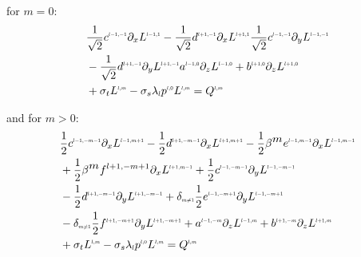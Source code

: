 for $m=0$:
\begin{align}
&
\frac{1}{\sqrt{2}}c^{\scaleto{l-1,-1}{4pt}}\partial_x L^{\scaleto{l-1,1}{4pt}}
-\frac{1}{\sqrt{2}}d^{\scaleto{l+1,-1}{4pt}}\partial_x L^{\scaleto{l+1,1}{4pt}}
\frac{1}{\sqrt{2}}c^{\scaleto{l-1,-1}{4pt}}\partial_y L^{\scaleto{l-1,-1}{4pt}}
\nonumber
\\&
-\frac{1}{\sqrt{2}}d^{\scaleto{l+1,-1}{4pt}}\partial_y L^{\scaleto{l+1,-1}{4pt}}
a^{\scaleto{l-1,0}{4pt}}\partial_z L^{\scaleto{l-1,0}{4pt}}
+b^{\scaleto{l+1,0}{4pt}}\partial_z L^{\scaleto{l+1,0}{4pt}}
\nonumber
\\&
+\sigma_t L^{\scaleto{l,m}{4pt}}
-\sigma_s\lambda_{\scaleto{l}{4pt}}p^{\scaleto{l,0}{4pt}}L^{\scaleto{l,m}{4pt}}
= Q^{\scaleto{l,m}{4pt}}
\label{eq:rpn_m_=_z}
\end{align}

and for $m>0$:
\begin{align}
&
\frac{1}{2}c^{\scaleto{l-1,-m-1}{4pt}}\partial_x L^{\scaleto{l-1,m+1}{4pt}}
-\frac{1}{2}d^{\scaleto{l+1,-m-1}{4pt}}\partial_x L^{\scaleto{l+1,m+1}{4pt}}
-\frac{1}{2}\beta^{\scaleto{m}{4pt}}e^{\scaleto{l-1,m-1}{4pt}}\partial_x L^{\scaleto{l-1,m-1}{4pt}}
\nonumber
\\&
+\frac{1}{2}\beta^{\scaleto{m}{4pt}}f^{l+1,-m+1}\partial_x L^{\scaleto{l+1,m-1}{4pt}}
+\frac{1}{2}c^{\scaleto{l-1,-m-1}{4pt}}\partial_y L^{\scaleto{l-1,-m-1}{4pt}}
\nonumber
\\&
-\frac{1}{2}d^{\scaleto{l+1,-m-1}{4pt}}\partial_y L^{\scaleto{l+1,-m-1}{4pt}}
+\delta_{\scaleto{m\neq 1}{4pt}}\frac{1}{2}e^{\scaleto{l-1,-m+1}{4pt}}\partial_y L^{\scaleto{l-1,-m+1}{4pt}}
\nonumber
\\&
-\delta_{\scaleto{m\neq 1}{4pt}}\frac{1}{2}f^{\scaleto{l+1,-m+1}{4pt}}\partial_y L^{\scaleto{l+1,-m+1}{4pt}}
+a^{\scaleto{l-1,-m}{4pt}}\partial_z L^{\scaleto{l-1,m}{4pt}}
+b^{\scaleto{l+1,-m}{4pt}}\partial_z L^{\scaleto{l+1,m}{4pt}}
\nonumber
\\&
+\sigma_t L^{\scaleto{l,m}{4pt}}
-\sigma_s\lambda_{\scaleto{l}{4pt}}p^{\scaleto{l,0}{4pt}}L^{\scaleto{l,m}{4pt}}
= Q^{\scaleto{l,m}{4pt}}
\label{eq:rpn_m_>_z}
\end{align}

